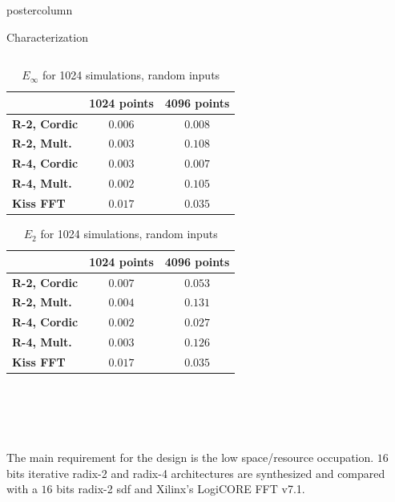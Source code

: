 \documentclass[final]{beamer}
\begin{document}
\begin{frame}{}
\begin{columns}
\begin{column}{.5\textwidth}
\begin{beamercolorbox}[center,wd=\textwidth]{postercolumn}
\begin{minipage}[T]{.99\textwidth}
{\begin{block}{Characterization}
\begin{column}{.37\textwidth}
			\end{column}
			\vrule
			\begin{column}{.52\textwidth}
				\begin{table}[htb!]
				\caption{$E_\infty$ for 1024 simulations, random inputs}
				\begin{tabular}{l c c}
				 & \textbf{1024 points} & \textbf{4096 points}\\ \hline 
				\textbf{R-2, Cordic} & $0.006$ & $0.008 $\\
				\textbf{R-2, Mult.} & $0.003$ & $0.108$\\
				\textbf{R-4, Cordic} & $0.003$ & $0.007$\\
				\textbf{R-4, Mult.} & $0.002$ & $0.105$\\
				\textbf{Kiss FFT} & $0.017$ & $0.035$\\\hline
				\end{tabular}
				\label{table:errorInf}
				\end{table}
				\begin{table}[htb!]
				\caption{$E_2$ for 1024 simulations, random inputs}
				\begin{tabular}{l c c}
				 & \textbf{1024 points} & \textbf{4096 points}\\ \hline 
				\textbf{R-2, Cordic} & $0.007$  & $0.053$\\
				\textbf{R-2, Mult.} & $0.004$ & $0.131$\\
				\textbf{R-4, Cordic} & $0.002$ & $0.027$\\
				\textbf{R-4, Mult.} & $0.003$ & $0.126$\\
				\textbf{Kiss FFT} & $0.017$ & $0.035$\\\hline
				\end{tabular}
				\label{table:error2}
				\end{table}
			\end{column}\\
			~\\
			\begin{column}{.32\textwidth}
			The main requirement for the design is the low space/resource occupation. $16$ bits iterative radix-2 and radix-4 architectures are 
			synthesized and compared with a $16$ bits radix-2 sdf and Xilinx's LogiCORE FFT v7.1.
				

\end{column}
\end{block}}
\end{minipage}
\end{beamercolorbox}
\end{column}
\end{columns}
\end{frame}
\end{document}
